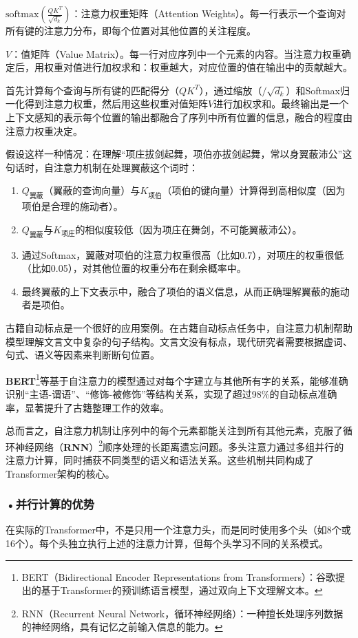 $\text{softmax}\left(\frac{QK^T}{\sqrt{d_k}}\right)$：注意力权重矩阵（Attention Weights）。每一行表示一个查询对所有键的注意力分布，即每个位置对其他位置的关注程度。

$V$：值矩阵（Value Matrix）。每一行对应序列中一个元素的内容。当注意力权重确定后，用权重对值进行加权求和：权重越大，对应位置的值在输出中的贡献越大。

首先计算每个查询与所有键的匹配得分（$QK^T$），通过缩放（$/\sqrt{d_k}$）和Softmax归一化得到注意力权重，然后用这些权重对值矩阵$V$进行加权求和。最终输出是一个上下文感知的表示每个位置的输出都融合了序列中所有位置的信息，融合的程度由注意力权重决定。

假设这样一种情况：在理解“项庄拔剑起舞，项伯亦拔剑起舞，常以身翼蔽沛公”这句话时，自注意力机制在处理翼蔽这个词时：
\begin{enumerate}
\item $Q_{\text{翼蔽}}$（翼蔽的查询向量）与$K_{\text{项伯}}$（项伯的键向量）计算得到高相似度（因为项伯是合理的施动者）。
\item $Q_{\text{翼蔽}}$与$K_{\text{项庄}}$的相似度较低（因为项庄在舞剑，不可能翼蔽沛公）。
\item 通过Softmax，翼蔽对项伯的注意力权重很高（比如0.7），对项庄的权重很低（比如0.05），对其他位置的权重分布在剩余概率中。
\item 最终翼蔽的上下文表示中，融合了项伯的语义信息，从而正确理解翼蔽的施动者是项伯。
\end{enumerate}

古籍自动标点是一个很好的应用案例。在古籍自动标点任务中，自注意力机制帮助模型理解文言文中复杂的句子结构。文言文没有标点，现代研究者需要根据虚词、句式、语义等因素来判断断句位置。

\textbf{BERT}\footnote{BERT（Bidirectional Encoder Representations from Transformers）：谷歌提出的基于Transformer的预训练语言模型，通过双向上下文理解文本。}等基于自注意力的模型通过对每个字建立与其他所有字的关系，能够准确识别“主语-谓语”、“修饰-被修饰”等结构关系，实现了超过98\%的自动标点准确率，显著提升了古籍整理工作的效率。

总而言之，自注意力机制让序列中的每个元素都能关注到所有其他元素，克服了循环神经网络（\textbf{RNN}）\footnote{RNN（Recurrent Neural Network，循环神经网络）：一种擅长处理序列数据的神经网络，具有记忆之前输入信息的能力。}顺序处理的长距离遗忘问题。多头注意力通过多组并行的注意力计算，同时捕获不同类型的语义和语法关系。这些机制共同构成了Transformer架构的核心。

\subsubsection*{\textbf{•并行计算的优势}}
在实际的Transformer中，不是只用一个注意力头，而是同时使用多个头（如8个或16个）。每个头独立执行上述的注意力计算，但每个头学习不同的关系模式。

